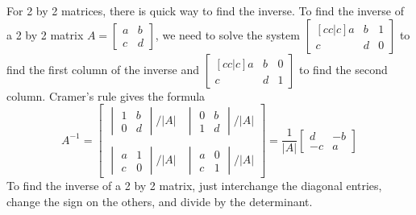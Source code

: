 For 2 by 2 matrices, there is quick way to find the inverse. To find the inverse of a 2 by 2 matrix $A=\begin{bmatrix}a&b\\c&d\end{bmatrix}$, we need to solve the system $\begin{bmatrix}[cc|c]a&b&1\\c&d&0\end{bmatrix}$ to find the first column of the inverse and $\begin{bmatrix}[cc|c]a&b&0\\c&d&1\end{bmatrix}$ to find the second column.  Cramer's rule gives the formula $$A^{-1}=
\begin{bmatrix}
\begin{vmatrix}1&b\\0&d\end{vmatrix}/|A|&\begin{vmatrix}0&b\\1&d\end{vmatrix}/|A|\\ \\
\begin{vmatrix}a&1\\c&0\end{vmatrix}/|A|&\begin{vmatrix}a&0\\c&1\end{vmatrix}/|A|\end{bmatrix} 
= \frac{1}{|A|}
\begin{bmatrix}d&-b\\-c&a\end{bmatrix}
$$
To find the inverse of a 2 by 2 matrix, just interchange the diagonal entries, change the sign on the others, and divide by the determinant.

